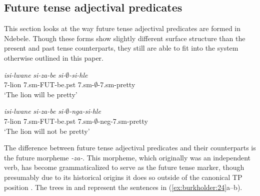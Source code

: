 \documentclass[output=paper]{langsci/langscibook}
\begin{document}
{\subsection{Future tense adjectival predicates}

This section looks at the way future tense adjectival predicates are formed in Ndebele. Though these forms show slightly different surface structure than the present and past tense counterparts, they still are able to fit into the system otherwise outlined in this paper.


\begin{exe}
\ex \begin{xlist}
\ex \gll \textit{isi-lwane} \textit{si-za-be} \textit{si-$\emptyset$-si-hle}\\
       7-lion 7.{\sc sm}-FUT-be.{\sc pst} 7.{\sc sm}-$\emptyset$-7.{\sc sm}-pretty\\
    \glt `The lion will be pretty' 

\ex \gll \textit{isi-lwane} \textit{si-za-be} \textit{si-$\emptyset$-nga-si-hle}\\
       7-lion 7.{\sc sm}-FUT-be.{\sc pst} 7.{\sc sm}-$\emptyset$-{\sc neg}-7.{\sc sm}-pretty\\
    \glt `The lion will not be pretty' 
\end{xlist}
\end{exe}

The difference between future tense adjectival predicates and their counterparts is the future morpheme \textit{-za-}. This morpheme, which originally was an independent verb, has become grammaticalized to serve as the future tense marker, though presumably due to its historical origins it does so outside of the canonical TP position \citep{Sibanda2004}. The trees in  and  represent the sentences in (\ref{ex:burkholder:24}a--b).



}
\end{document}
